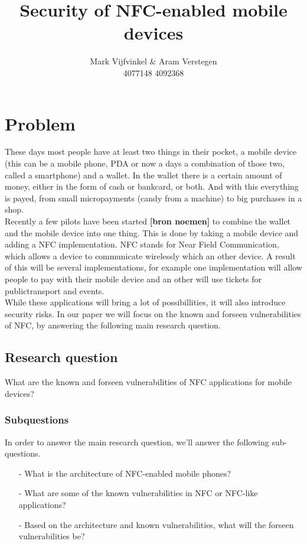 \documentclass[11pt]{article} %
\title{Security of NFC-enabled mobile devices}
\author{Mark Vijfvinkel \& Aram Verstegen \\ 4077148 4092368}
\date{} %
\begin{document}
\maketitle


\section{Problem}

These days most people have at least two things in their pocket, a mobile device (this can be a mobile phone, PDA or now a days a combination of those two, called a smartphone) and a wallet. In the wallet there is a certain amount of money, either in the form of cash or bankcard, or both. And with this everything is payed, from small micropayments (candy from a machine) to big purchases in a shop.
\\ Recently a few pilots have been started \textbf { [bron noemen]} to combine the wallet and the mobile device into one thing. This is done by taking a mobile device and adding a NFC implementation. NFC stands for Near Field Communication, which allows a device to communicate wirelessly which an other device. A result of this will be several implementations, for example one implementation will allow people to pay with their mobile device and an other will use tickets for publictransport and events. 
\\ While these applications will bring a lot of possibillities, it will also introduce security risks. In our paper we will focus on the known and forseen vulnerabilities of NFC, by answering the following main research question.

\subsection{Research question}

What are the known and forseen vulnerabilities of NFC applications for mobile devices? %

\subsubsection{Subquestions}

In order to answer the main research question, we'll answer the following sub-questions.
\begin{itemize}
\item [-] What is the architecture of NFC-enabled mobile phones?

\item [-] What are some of the known vulnerabilities in NFC or NFC-like applications?

\item [-] Based on the architecture and known vulnerabilities, what will the forseen vulnerabilities be?

\end{itemize}
\end{document}
